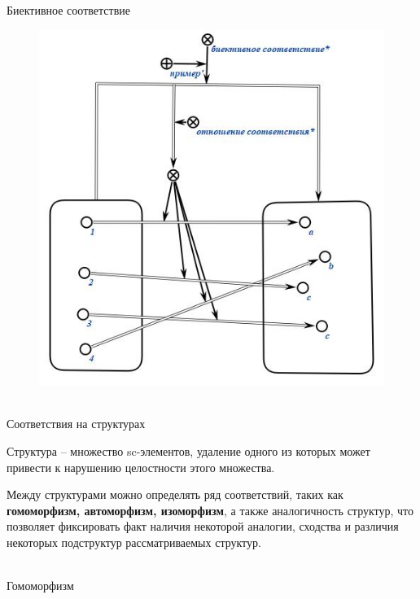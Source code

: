 \begin{frame}{\\Биективное соответствие}
    \topline
    \begin{center}
        \begin{figure}[Hb]
            \centering
            \includegraphics[scale=.45]{figures/sd_correspondences/Bijection.jpeg}
        \end{figure}
    \end{center}
\end{frame}

\begin{frame}{\\Соответствия на структурах}
\topline
\begin{SCn}
Структура – множество sc-элементов, удаление одного из которых может привести к нарушению целостности этого множества.

Между структурами можно определять ряд соответствий, таких как \textbf{гомоморфизм, автоморфизм, изоморфизм}, а также аналогичность структур, что позволяет фиксировать факт наличия некоторой аналогии,
сходства и различия некоторых подструктур рассматриваемых структур.
\end{SCn}
\end{frame}

\begin{frame}{\\Гомоморфизм}
\topline
\begin{SCn}

\end{SCn}
\end{frame}

